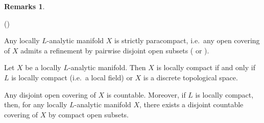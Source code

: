 \documentclass[a4paper, reqno, 10pt]{amsart}
\theoremstyle{definition}
\newtheorem{remarks}[theorem]{Remarks}
\newenvironment{altenumerate}
	{\begin{list}
		{\textup{(\theenumi)} }
		{\usecounter{enumi}
			\setlength{\labelwidth}{0pt}
			\setlength{\labelsep}{0pt}
			\setlength{\leftmargin}{0pt}
			\setlength{\itemsep}{0pt}
			\setlength{\topsep}{0pt}
		\renewcommand{\theenumi}{\roman{enumi}}
		}}
	{\end{list}}
\numberwithin{equation}{section}
\begin{document}
\begin{remarks}\label{Rmk 1 - Locally analytic manifold has disjoint countable covering by compact open subsets}
	\begin{altenumerate}
		\item
		Any locally $L$-analytic manifold $X$ is strictly paracompact, i.e.\ any open covering of $X$ admits a refinement by pairwise disjoint open subsets (\cite[5.3.7]{Bourbaki07VarDiffAnFasciDeResult} or \cite[Prop.\ 8.7]{Schneider11pAdicLieGrps}).
		\item
		Let $X$ be a locally $L$-analytic manifold. Then $X$ is locally compact if and only if $L$ is locally compact (i.e.\ a local field) or $X$ is a discrete topological space.
		\item
		Any disjoint open covering of $X$ is countable.
		Moreover, if $L$ is locally compact, then, for any locally $L$-analytic manifold $X$, there exists a disjoint countable covering of $X$ by compact open subsets.
	\end{altenumerate}
\end{remarks}
\end{document}
